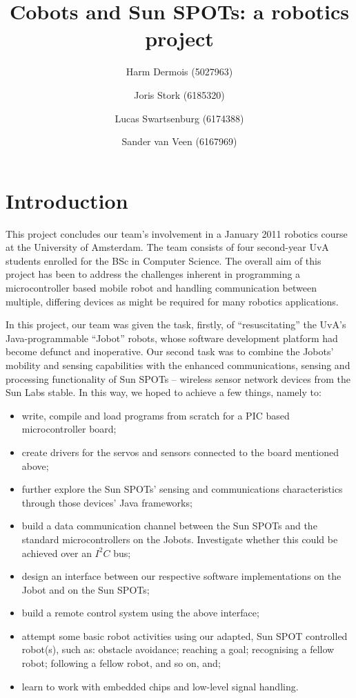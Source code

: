 \documentclass[a4paper,10pt]{article} %
\author{Harm Dermois (5027963) \and Joris Stork (6185320) \and
Lucas Swartsenburg (6174388) \and Sander van Veen (6167969)}
\title{Cobots and Sun SPOTs: a robotics project}
\begin{document}
\maketitle

\abstract{}

\tableofcontents

\pagebreak

\section{Introduction} %

This project concludes our team's involvement in a January 2011 robotics course
at the University of Amsterdam. The team consists of four second-year UvA
students enrolled for the BSc in Computer Science. The overall aim of this
project has been to address the challenges inherent in programming a microcontroller
based mobile robot and handling communication between multiple, differing
devices as might be required for many robotics applications.

In this project, our team was given the task, firstly, of ``resuscitating'' the
UvA's Java-programmable ``Jobot'' robots, whose software development platform
had become defunct and inoperative. Our second task was to combine the Jobots'
mobility and sensing capabilities with the enhanced communications, sensing and
processing functionality of Sun SPOTs -- wireless sensor network devices from
the Sun Labs stable. In this way, we hoped to achieve a few things, namely to:

\begin{itemize}
    \item write, compile and load programs from scratch for a PIC based
    microcontroller board;
    \item create drivers for the servos and sensors connected to the board
    mentioned above;
    \item further explore the Sun SPOTs' sensing and communications
    characteristics through those devices' Java frameworks;
    \item build a data communication channel between the Sun SPOTs and the
    standard microcontrollers on the Jobots. Investigate whether this could be
    achieved over an $I^2C$ bus;
    \item design an interface between our respective software implementations on
    the Jobot and on the Sun SPOTs;
    \item build a remote control system using the above interface;
    \item attempt some basic robot activities using our adapted, Sun SPOT
    controlled robot(s), such as: obstacle avoidance; reaching a goal;
    recognising a fellow robot; following a fellow robot, and so on, and;
    \item learn to work with embedded chips and low-level signal handling.
\end{itemize}
\end{document}
